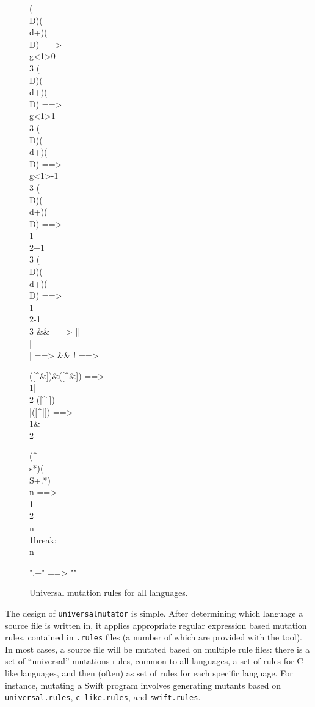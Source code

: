 \begin{figure}
{\begin{code}
(\\D)(\\d+)(\\D) ==> \\g<1>0\\3
(\\D)(\\d+)(\\D) ==> \\g<1>1\\3
(\\D)(\\d+)(\\D) ==> \\g<1>-1\\3
(\\D)(\\d+)(\\D) ==> \\1\\2+1\\3
(\\D)(\\d+)(\\D) ==> \\1\\2-1\\3
\&\& ==> ||
\\|\\| ==> \&\&
! ==>

([^\&])\&([^\&]) ==> \\1|\\2
([^|])\\|([^|]) ==> \\1\&\\2

(^\\s*)(\\S+.*)\\n ==> \\1\\2\\n\\1break;\\n

".+" ==> ""
\end{code}
}
\caption{Universal mutation rules for all languages.}
\label{fig:universal}
\end{figure}

The design of {\tt universalmutator} is simple.  After determining
which language a source file is written in, it applies appropriate
regular expression based mutation rules, contained in {\tt .rules}
files (a number of which are provided with the tool).  In most cases, a source file will be mutated based on multiple
rule files:  there is a set of ``universal'' mutations rules, common
to all languages, a set of rules for C-like languages, and then
(often) as set of rules for each specific language.  For instance,
mutating a Swift program involves generating mutants based on {\tt
  universal.rules}, {\tt c\_like.rules}, and {\tt swift.rules}.  

